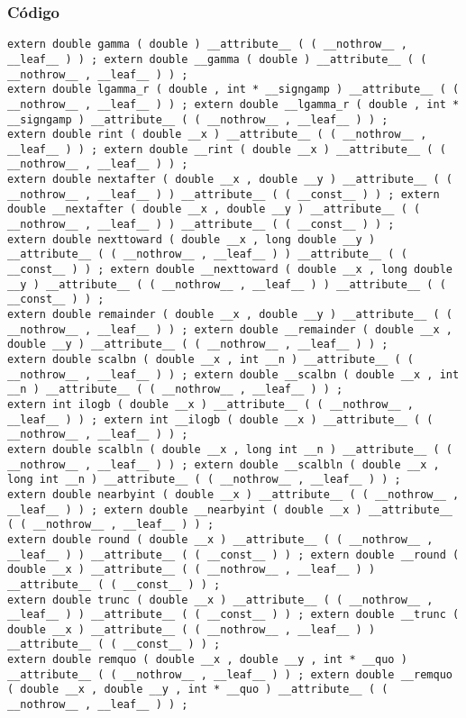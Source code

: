 \documentclass{beamer}
\begin{document}
\begin{frame}[fragile]
\frametitle{C\'odigo}
\begin{verbatim}
extern double gamma ( double ) __attribute__ ( ( __nothrow__ , __leaf__ ) ) ; extern double __gamma ( double ) __attribute__ ( ( __nothrow__ , __leaf__ ) ) ; 
extern double lgamma_r ( double , int * __signgamp ) __attribute__ ( ( __nothrow__ , __leaf__ ) ) ; extern double __lgamma_r ( double , int * __signgamp ) __attribute__ ( ( __nothrow__ , __leaf__ ) ) ; 
extern double rint ( double __x ) __attribute__ ( ( __nothrow__ , __leaf__ ) ) ; extern double __rint ( double __x ) __attribute__ ( ( __nothrow__ , __leaf__ ) ) ; 
extern double nextafter ( double __x , double __y ) __attribute__ ( ( __nothrow__ , __leaf__ ) ) __attribute__ ( ( __const__ ) ) ; extern double __nextafter ( double __x , double __y ) __attribute__ ( ( __nothrow__ , __leaf__ ) ) __attribute__ ( ( __const__ ) ) ; 
extern double nexttoward ( double __x , long double __y ) __attribute__ ( ( __nothrow__ , __leaf__ ) ) __attribute__ ( ( __const__ ) ) ; extern double __nexttoward ( double __x , long double __y ) __attribute__ ( ( __nothrow__ , __leaf__ ) ) __attribute__ ( ( __const__ ) ) ; 
extern double remainder ( double __x , double __y ) __attribute__ ( ( __nothrow__ , __leaf__ ) ) ; extern double __remainder ( double __x , double __y ) __attribute__ ( ( __nothrow__ , __leaf__ ) ) ; 
extern double scalbn ( double __x , int __n ) __attribute__ ( ( __nothrow__ , __leaf__ ) ) ; extern double __scalbn ( double __x , int __n ) __attribute__ ( ( __nothrow__ , __leaf__ ) ) ; 
extern int ilogb ( double __x ) __attribute__ ( ( __nothrow__ , __leaf__ ) ) ; extern int __ilogb ( double __x ) __attribute__ ( ( __nothrow__ , __leaf__ ) ) ; 
extern double scalbln ( double __x , long int __n ) __attribute__ ( ( __nothrow__ , __leaf__ ) ) ; extern double __scalbln ( double __x , long int __n ) __attribute__ ( ( __nothrow__ , __leaf__ ) ) ; 
extern double nearbyint ( double __x ) __attribute__ ( ( __nothrow__ , __leaf__ ) ) ; extern double __nearbyint ( double __x ) __attribute__ ( ( __nothrow__ , __leaf__ ) ) ; 
extern double round ( double __x ) __attribute__ ( ( __nothrow__ , __leaf__ ) ) __attribute__ ( ( __const__ ) ) ; extern double __round ( double __x ) __attribute__ ( ( __nothrow__ , __leaf__ ) ) __attribute__ ( ( __const__ ) ) ; 
extern double trunc ( double __x ) __attribute__ ( ( __nothrow__ , __leaf__ ) ) __attribute__ ( ( __const__ ) ) ; extern double __trunc ( double __x ) __attribute__ ( ( __nothrow__ , __leaf__ ) ) __attribute__ ( ( __const__ ) ) ; 
extern double remquo ( double __x , double __y , int * __quo ) __attribute__ ( ( __nothrow__ , __leaf__ ) ) ; extern double __remquo ( double __x , double __y , int * __quo ) __attribute__ ( ( __nothrow__ , __leaf__ ) ) ; 
\end{verbatim}
\end{frame}
\end{document}
